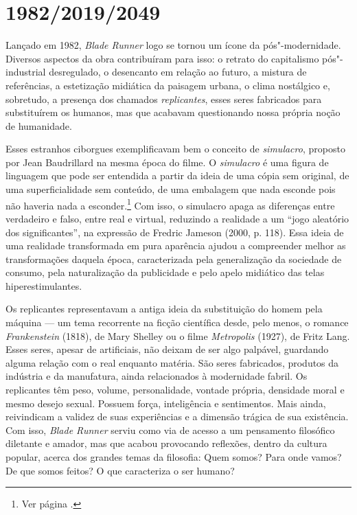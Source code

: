 \chapter{1982/2019/2049}

Lançado em 1982, \emph{Blade Runner} logo se tornou um ícone da
pós"-modernidade. Diversos aspectos da obra contribuíram para isso: o
retrato do capitalismo pós"-industrial desregulado, o desencanto em
relação ao futuro, a mistura de referências, a estetização midiática da
paisagem urbana, o clima nostálgico e, sobretudo, a presença dos
chamados \emph{replicantes}, esses seres fabricados para substituírem os
humanos, mas que acabavam questionando nossa própria noção de
humanidade.

Esses estranhos ciborgues exemplificavam bem o conceito de
\emph{simulacro}, proposto por Jean Baudrillard na mesma época do filme.
O \emph{simulacro} é uma figura de linguagem que pode ser entendida a
partir da ideia de uma cópia sem original, de uma superficialidade sem
conteúdo, de uma embalagem que nada esconde pois não haveria nada a
esconder.\footnote{Ver página \pageref{saturacao}.} Com isso, o simulacro apaga as diferenças
entre verdadeiro e falso, entre real e virtual, reduzindo a realidade a
um ``jogo aleatório dos significantes'', na expressão de Fredric Jameson
(2000, p. 118). Essa ideia de uma realidade transformada em pura
aparência ajudou a compreender melhor as transformações daquela época,
caracterizada pela generalização da sociedade de consumo, pela
naturalização da publicidade e pelo apelo midiático das telas
hiperestimulantes.

Os replicantes representavam a antiga ideia da substituição do homem
pela máquina --- um tema recorrente na ficção científica desde, pelo
menos, o romance \emph{Frankenstein} (1818), de Mary Shelley ou o filme
\emph{Metropolis} (1927), de Fritz Lang. Esses seres, apesar de
artificiais, não deixam de ser algo palpável, guardando alguma relação
com o real enquanto matéria. São seres fabricados, produtos da indústria
e da manufatura, ainda relacionados à modernidade fabril. Os replicantes
têm peso, volume, personalidade, vontade própria, densidade moral e
mesmo desejo sexual. Possuem força, inteligência e sentimentos. Mais
ainda, reivindicam a validez de suas experiências e a dimensão trágica
de sua existência. Com isso, \emph{Blade Runner} serviu como via de
acesso a um pensamento filosófico diletante e amador, mas que acabou
provocando reflexões, dentro da cultura popular, acerca dos grandes
temas da filosofia: Quem somos? Para onde vamos? De que somos feitos? O
que caracteriza o ser humano?

